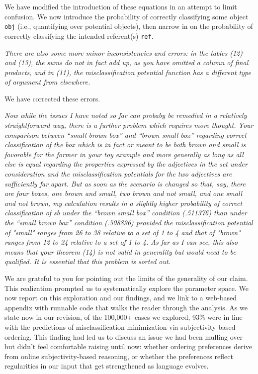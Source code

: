 \documentclass[12pt]{article}
\begin{document}
We have modified the introduction of these equations in an attempt to limit confusion. We now introduce the probability of correctly classifying some object \texttt{obj} (i.e., quantifying over potential objects), then narrow in on the probability of correctly classifying the intended referent(s) \texttt{ref}.
	
\item \emph{There are also some more minor inconsistencies and errors: in the tables
	(12) and (13), the sums do not in fact add up, as you have omitted a column
	of final products, and in (11), the misclassification potential function has
	a different type of argument from elsewhere.}

We have corrected these errors.
	
\item \emph{Now while the issues I have noted so far can probaby be remedied in a
	relatively straightforward way, there is a further problem which requires
	more thought. Your comparison between ``small brown box'' and ``brown small
	box'' regarding correct classification of the box which is in fact or meant
	to be both brown and small is favorable for the former in your toy example
	and more generally as long as all else is equal regarding the properties
	expressed by the adjectives in the set under consideration and the
	misclassification potentials for the two adjectives are sufficiently far
	apart. But as soon as the scenario is changed so that, say, there are four
	boxes, one brown and small, two  brown and not small, and one small and not
	brown, my calculation results in a slightly higher probability of correct
	classification of sb under the ``brown small box'' condition (.511376) than
	under the ``small brown box'' condition (.508896) provided the
	misclassification potential of "small" ranges from 26 to 38 relative to a
	set of 1 to 4 and that of "brown" ranges from 12 to 24 relative to a set of
	1 to 4. As far as I can see, this  also means that your theorem (14) is not
	valid in generality but would need to be qualified. It is essential that
	this problem is sorted out.}

We are grateful to you for pointing out the limits of the generality of our claim. This realization prompted us to systematically explore the parameter space. We now report on this exploration and our findings, and we link to a web-based appendix with runnable code that walks the reader through the analysis. As we state now in our revision, of the 100,000+ cases we explored, 93\% were in line with the predictions of misclassification minimization via  subjectivity-based ordering. This finding had led us to discuss an issue we had been mulling over but didn't feel comfortable raising until now: whether ordering preferences derive from  online subjectivity-based reasoning, or whether the preferences reflect regularities in our input that get strengthened as language evolves.
	
\end{document}
